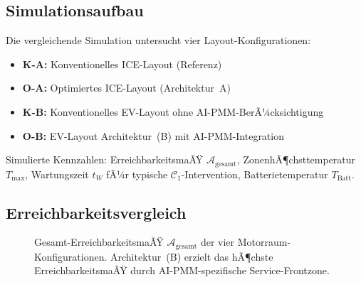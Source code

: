 ﻿\documentclass[12pt,a4paper]{article}
\begin{document}
\subsection{Simulationsaufbau}

Die vergleichende Simulation untersucht vier Layout-Konfigurationen:

\begin{itemize}[leftmargin=*]
	\item \textbf{K-A:} Konventionelles ICE-Layout (Referenz)
	\item \textbf{O-A:} Optimiertes ICE-Layout (Architektur~A)
	\item \textbf{K-B:} Konventionelles EV-Layout ohne AI-PMM-BerÃ¼cksichtigung
	\item \textbf{O-B:} EV-Layout Architektur~(B) mit AI-PMM-Integration
\end{itemize}

Simulierte Kennzahlen: ErreichbarkeitsmaÃŸ $\mathcal{A}_\mathrm{gesamt}$,
ZonenhÃ¶chsttemperatur $T_\mathrm{max}$, Wartungszeit $t_W$ fÃ¼r typische
$\mathcal{C}_1$-Intervention, Batterietemperatur $T_\mathrm{Batt}$.

\subsection{Erreichbarkeitsvergleich}

\begin{figure}[H]
	\centering
	\caption{Gesamt-ErreichbarkeitsmaÃŸ $\mathcal{A}_\mathrm{gesamt}$ der vier
		Motorraum-Konfigurationen. Architektur~(B) erzielt das hÃ¶chste ErreichbarkeitsmaÃŸ
		durch AI-PMM-spezifische Service-Frontzone.}
	\label{fig:erreichbarkeit_vergleich}
\end{figure}
\end{document}
